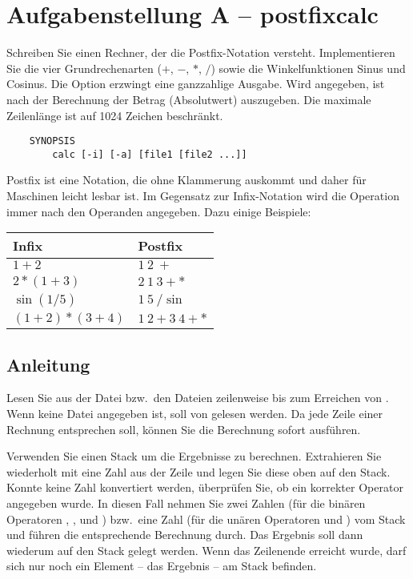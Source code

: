 




\section*{Aufgabenstellung A -- postfixcalc}
Schreiben Sie einen Rechner, der die Postfix-Notation versteht.
Implementieren Sie die vier Grundrechenarten (\(+\), \(-\), \(*\), \(/\)) sowie
die Winkelfunktionen Sinus und Cosinus. Die Option  erzwingt eine
ganzzahlige Ausgabe. Wird  angegeben, ist nach der Berechnung der
Betrag (Absolutwert) auszugeben. Die maximale Zeilenlänge ist auf 1024 Zeichen
beschränkt.

\begin{verbatim}
    SYNOPSIS
        calc [-i] [-a] [file1 [file2 ...]]
\end{verbatim}

Postfix ist eine Notation, die ohne Klammerung auskommt und daher für Maschinen
leicht lesbar ist. Im Gegensatz zur Infix-Notation wird die Operation immer nach
den Operanden angegeben. Dazu einige Beispiele:

\begin{tabular}{ll}
\toprule
Infix           & Postfix \\
\midrule
\(1+2\)         & \(1 \: 2 \: +\) \\
\(2*(1+3)\)     & \(2 \: 1 \: 3 + *\) \\
\(\sin(1/5)\)   & \(1 \: 5 \: / \sin\) \\
\((1+2)*(3+4)\) & \(1\:2 + 3\:4 + *\) \\
\bottomrule
\end{tabular}

\subsection*{Anleitung}
Lesen Sie aus der Datei bzw.\ den Dateien zeilenweise bis zum Erreichen von
. Wenn keine Datei angegeben ist, soll von 
gelesen werden. Da jede Zeile einer Rechnung entsprechen soll, können Sie die
Berechnung sofort ausführen.

Verwenden Sie einen Stack um die Ergebnisse zu berechnen. Extrahieren Sie
wiederholt mit  eine Zahl aus der Zeile und legen Sie
diese oben auf den Stack. Konnte keine Zahl konvertiert werden, überprüfen Sie,
ob ein korrekter Operator angegeben wurde. In diesen Fall nehmen Sie zwei Zahlen
(für die binären Operatoren \osueinput{+}, \osueinput{-}, \osueinput{/} und
\osueinput{*}) bzw.\ eine Zahl (für die unären Operatoren  und
) vom Stack und führen die entsprechende Berechnung durch. Das
Ergebnis soll dann wiederum auf den Stack gelegt werden.
Wenn das Zeilenende erreicht wurde, darf sich nur noch ein Element -- das
Ergebnis -- am Stack befinden.

